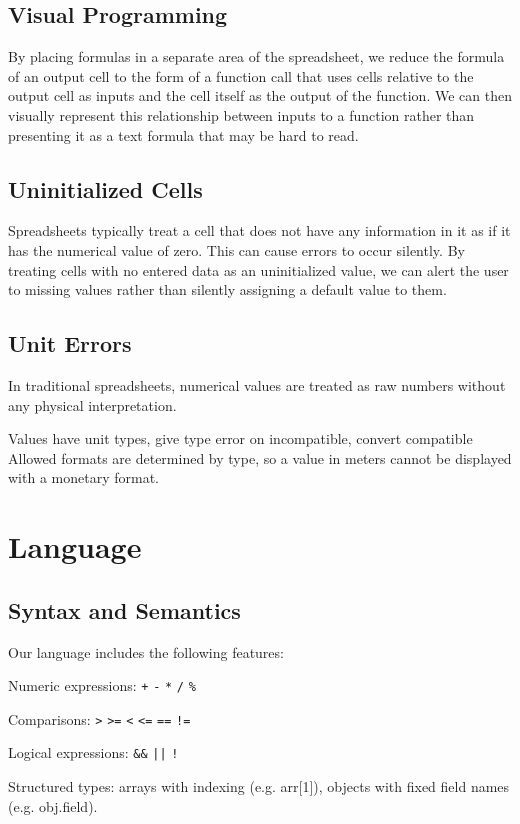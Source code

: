 \documentclass{acm_proc_article-sp}
\begin{document}
\subsection{Visual Programming}
By placing formulas in a separate area of the spreadsheet, we reduce
the formula of an output cell to the form of a function call that uses
cells relative to the output cell as inputs and the cell itself as the
output of the function. We can then visually represent this
relationship between inputs to a function rather than presenting it as
a text formula that may be hard to read.

\subsection{Uninitialized Cells}
Spreadsheets typically treat a cell that does not have any information
in it as if it has the numerical value of zero. This can cause errors
to occur silently. By treating cells with no entered data as an
uninitialized value, we can alert the user to missing values rather
than silently assigning a default value to them.

\subsection{Unit Errors}
In traditional spreadsheets, numerical values are treated as raw
numbers without any physical interpretation.

Values have unit types, give type error on incompatible, convert
compatible Allowed formats are determined by type, so a value in
meters cannot be displayed with a monetary format.

\section{Language}

\subsection{Syntax and Semantics}
Our language includes the following features:

Numeric expressions: \verb#+# \verb#-# \verb#*# \verb#/# \verb#%#

Comparisons: \verb#># \verb#>=# \verb#<# \verb#<=# \verb#==# \verb#!=#

Logical expressions: \verb#&&# \verb#||# \verb#!#

Structured types: arrays with indexing (e.g. arr[1]), objects with
fixed field names (e.g. obj.field).
\end{document}
